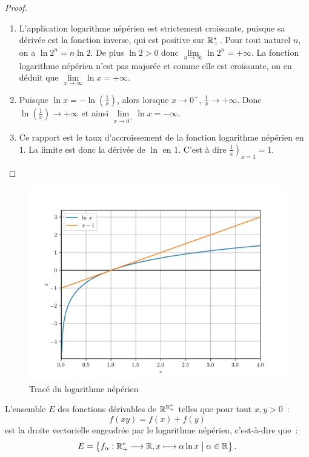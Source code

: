 \begin{proof}
  \begin{enumerate}
    \item L'application logarithme népérien est strictement croissante, puisque 
      sa dérivée est la fonction inverse, qui est positive sur \(\mathbb{R}_{+}^{*}\).  
      Pour tout naturel \(n\), on a \(\ln 2^n = n \ln 2\). De plus \(\ln 2 >0\) 
      donc \(\lim\limits_{n \to \infty} \ln 2^n = + \infty\). La fonction 
      logarithme népérien n'est pas majorée et comme elle est croissante, on en 
      déduit que \(\lim\limits_{x \to \infty} \ln x = +\infty\).
    \item Puisque \(\ln x = - \ln\left(\frac{1}{x}\right)\), alors lorsque 
      \(x\to 0^+\), \(\frac{1}{x} \to + \infty\). Donc \(\ln 
      \left(\frac{1}{x}\right) \to +\infty\) et ainsi \(\lim\limits_{x \to 0^+} 
      \ln x = - \infty\).
    \item Ce rapport est le taux d'accroissement de la fonction logarithme 
      népérien en \(1\). La limite est donc la dérivée de \(\ln\) en \(1\).  
      C'est à dire \(\left.\frac{1}{x}\right)_{x = 1} = 1\).
  \end{enumerate}
\end{proof}

\begin{figure}
  \centering
  \includegraphics[scale = 1.0]{lognep.png}
  \caption{Tracé du logarithme népérien}\label{fig:traceln}
\end{figure}

\begin{theo}
  L'ensemble \(E\) des fonctions dérivables de \(\mathbb{R}^{\mathbb{R}_{+}^{*}}\) telles que 
  pour tout \(x,y>0\)~:
  \begin{equation}\label{eq:fonclog}
    f(xy) = f(x)+f(y)
  \end{equation}
  est la droite vectorielle engendrée par le logarithme népérien, c'est-à-dire 
  que~:
  \[E = \left\{f_{\alpha}:\mathbb{R}_{+}^{*} \longrightarrow \mathbb{R}, x \longmapsto \alpha \ln x\mathrel{}\middle|\mathrel{}\alpha 
  \in \mathbb{R}\right\}.\]
\end{theo}


